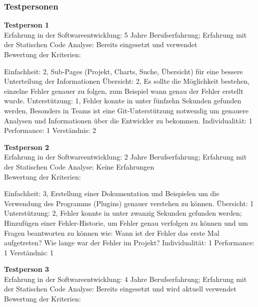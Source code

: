 \subsubsection{Testpersonen}
\textbf{Testperson 1} \\
Erfahrung in der Softwareentwicklung: 5 Jahre Berufserfahrung; Erfahrung mit der Statischen Code Analyse: Bereits eingesetzt und verwendet \\
Bewertung der Kriterien:

Einfachheit: 2, Sub-Pages (Projekt, Charts, Suche, Übersicht) für eine bessere Unterteilung der Informationen \newline Übersicht: 2, Es sollte die Möglichkeit bestehen, einzelne Fehler genauer zu folgen, zum Beispiel wann genau der Fehler erstellt wurde. \newline  Unterstützung: 1, Fehler konnte in unter fünfzehn Sekunden gefunden werden, Besonders in Teams ist eine Git-Unterstützung notwendig um genauere Analysen und Informationen über die Entwickler zu bekommen.  \newline  Individualität: 1 \newline  Performance: 1 \newline  Verständnis: 2 \newline 

\textbf{Testperson 2} \\
Erfahrung in der Softwareentwicklung: 2 Jahre Berufserfahrung; Erfahrung mit der Statischen Code Analyse: Keine Erfahrungen\\
Bewertung der Kriterien:

Einfachheit: 3, Erstellung einer Dokumentation und Beispielen um die Verwendung des Programms (Plugins) genauer verstehen zu können. \newline  Übersicht: 1 \newline  Unterstützung: 2, Fehler konnte in unter zwanzig Sekunden gefunden werden; Hinzufügen einer Fehler-Historie, um Fehler genau verfolgen zu können und um Fragen beantworten zu können wie: Wann ist der Fehler das erste Mal aufgetreten? Wie lange war der Fehler im Projekt? \newline  Individualität: 1 \newline  Performance: 1 \newline  Verständnis: 1 \newline 

\textbf{Testperson 3} \\
Erfahrung in der Softwareentwicklung: 4 Jahre Berufserfahrung; Erfahrung mit der Statischen Code Analyse: Bereits eingesetzt und wird aktuell verwendet\\
Bewertung der Kriterien:

